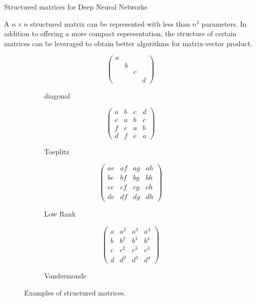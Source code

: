 \begin{frame}{Structured matrices for Deep Neural Networks}

  A $n \times n$ structured matrix can be represented with less than $n^2$ parameters. In addition to offering a more compact representation, the structure of certain matrices can be leveraged to obtain better algorithms for matrix-vector product.

  \begin{figure}[ht]
     \centering
     \begin{subfigure}[t]{2.2cm}
	 \centering
	 \begin{equation*}
	   \begin{pmatrix}
	      a &   &   &   \\
		& b &   &   \\
		&   & c &   \\
		&   &   & d
	   \end{pmatrix}
	 \end{equation*}
	 \caption*{diagonal}
     \end{subfigure}
     \begin{subfigure}[t]{2.2cm}
	 \centering
	 \begin{equation*}
	    \begin{pmatrix}
	      a & b & c & d \\
	      e & a & b & c \\
	      f & e & a & b \\
	      d & f & e & a
	    \end{pmatrix}
	 \end{equation*}
	 \caption*{Toeplitz}
     \end{subfigure}
     \begin{subfigure}[t]{2.8cm}
	 \centering
	 \begin{equation*}
	    \begin{pmatrix}
	      ae & af & ag & ah \\
	      be & bf & bg & bh \\
	      ce & cf & cg & ch \\
	      de & df & dg & dh
	    \end{pmatrix}
	 \end{equation*}
	 \caption*{Low Rank}
     \end{subfigure}
     \begin{subfigure}[t]{2.8cm}
	 \centering
	 \begin{equation*}
	    \begin{pmatrix}
	      a & a^2 & a^3 & a^4 \\
	      b & b^2 & b^3 & b^4 \\
	      c & c^2 & c^3 & c^4 \\
	      d & d^2 & d^3 & d^4
	    \end{pmatrix}
	 \end{equation*}
	 \caption*{Vandermonde}
     \end{subfigure}
    \caption{Examples of structured matrices.}
    \label{figure:example_structure_matrices}
  \end{figure}


\end{frame}
